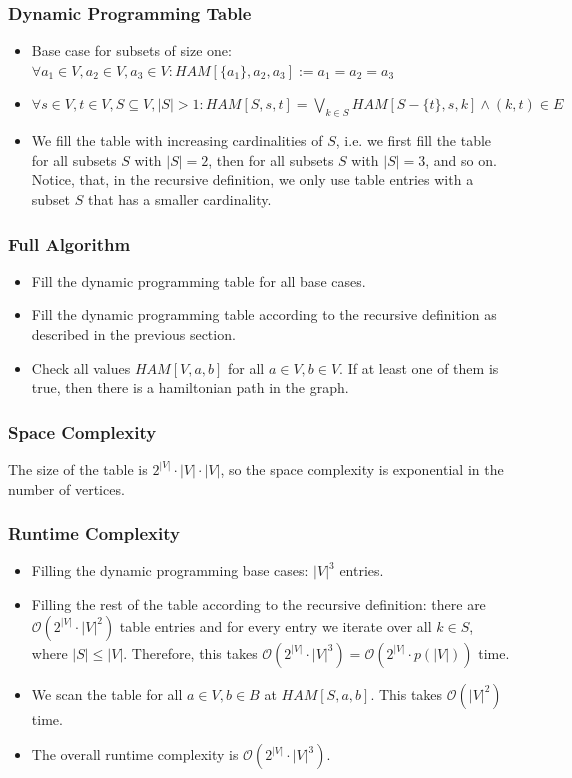 \documentclass[12pt]{article}
\begin{document}
\subsubsection*{Dynamic Programming Table}
\begin{itemize}
	\item Base case for subsets of size one: $\forall a_1 \in V, a_2 \in V, a_3 \in V: \mathit{HAM}[\{a_1\}, a_2, a_3] := a_1 = a_2 = a_3$
	\item $\forall s \in V, t \in V, S \subseteq V, |S| > 1: \mathit{HAM}[S, s, t] = \bigvee_{k \in S} \mathit{HAM}[S - \{t\}, s, k] \wedge (k, t) \in E$
	\item We fill the table with increasing cardinalities of $S$, i.e. we first fill the table for all subsets $S$ with $|S|=2$, then for all subsets $S$ with $|S|=3$, and so on. Notice, that, in the recursive definition, we only use table entries with a subset $S$ that has a smaller cardinality.
\end{itemize}

\subsubsection*{Full Algorithm}
\begin{itemize}
	\item Fill the dynamic programming table for all base cases.
	\item Fill the dynamic programming table according to the recursive definition as described in the previous section.
	\item Check all values $\mathit{HAM}[V, a, b]$ for all $a \in V, b \in V$. If at least one of them is true, then there is a hamiltonian path in the graph.
\end{itemize}

\subsubsection*{Space Complexity}
The size of the table is $2^{|V|} \cdot |V| \cdot |V|$, so the space complexity is exponential in the number of vertices.

\subsubsection*{Runtime Complexity}
\begin{itemize}
	\item Filling the dynamic programming base cases: $|V|^3$ entries.
	\item Filling the rest of the table according to the recursive definition: there are $\mathcal{O}(2^{|V|} \cdot |V|^2)$ table entries and for every entry we iterate over all $k \in S$, where $|S| \leq |V|$. Therefore, this takes $\mathcal{O}(2^{|V|} \cdot |V|^3) = \mathcal{O}(2^{|V|} \cdot p(|V|))$ time.
	\item We scan the table for all $a \in V, b \in B$ at $\mathit{HAM}[S, a, b]$. This takes $\mathcal{O}(|V|^2)$ time.
	\item The overall runtime complexity is $\mathcal{O}(2^{|V|} \cdot |V|^3)$. 
\end{itemize}
\end{document}
